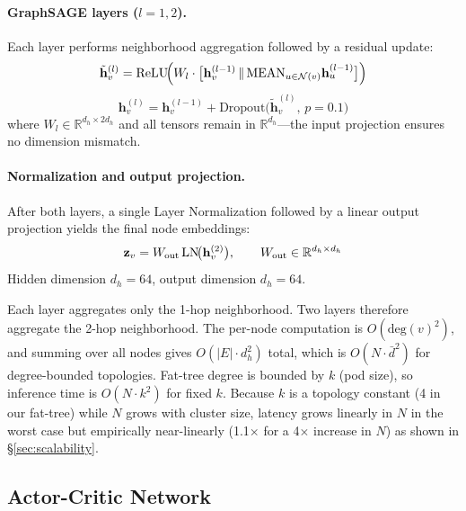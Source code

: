 \documentclass[review,1p]{elsarticle}
\theoremstyle{definition}
\begin{document}
\paragraph{GraphSAGE layers ($l = 1, 2$).}
Each layer performs neighborhood aggregation followed by a residual update:
\begin{equation}
  \tilde{\mathbf{h}}_v^{(l)} =
    \text{ReLU}\!\Bigl(
      W_l \cdot \bigl[\mathbf{h}_v^{(l-1)} \,\|\,
      \textstyle\text{MEAN}_{u \in \mathcal{N}(v)} \mathbf{h}_u^{(l-1)}\bigr]
    \Bigr)
  \label{eq:sage}
\end{equation}
\begin{equation}
  \mathbf{h}_v^{(l)} = \mathbf{h}_v^{(l-1)}
    + \text{Dropout}\!\bigl(\tilde{\mathbf{h}}_v^{(l)},\, p{=}0.1\bigr)
  \label{eq:residual}
\end{equation}
where $W_l \in \mathbb{R}^{d_h \times 2d_h}$ and all tensors remain in
$\mathbb{R}^{d_h}$---the input projection ensures no dimension mismatch.

\paragraph{Normalization and output projection.}
After both layers, a single Layer Normalization followed by a linear
output projection yields the final node embeddings:
\begin{equation}
  \mathbf{z}_v = W_{\rm out}\,\text{LN}\!\bigl(\mathbf{h}_v^{(2)}\bigr),
  \qquad W_{\rm out} \in \mathbb{R}^{d_h \times d_h}
  \label{eq:output_proj}
\end{equation}
Hidden dimension $d_h = 64$, output dimension $d_h = 64$.

Each layer aggregates only the 1-hop neighborhood.  Two layers
therefore aggregate the 2-hop neighborhood.  The per-node computation
is $O(\text{deg}(v)^2)$, and summing over all nodes gives
$O(|E| \cdot d_h^2)$ total, which is $O(N \cdot \bar{d}^2)$ for
degree-bounded topologies.  Fat-tree degree is bounded by $k$ (pod
size), so inference time is $O(N \cdot k^2)$ for fixed $k$.  Because
$k$ is a topology constant (4 in our fat-tree) while $N$ grows with
cluster size, latency grows linearly in $N$ in the worst case but
empirically near-linearly (1.1$\times$ for a 4$\times$ increase in $N$) as shown in \S\ref{sec:scalability}.

\subsection{Actor-Critic Network}
\end{document}
